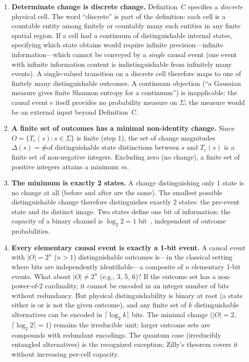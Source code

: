 \documentclass[aps,prd,twocolumn,showpacs,superscriptaddress,preprintnumbers]{revtex4-2}
\begin{document}
\begin{enumerate}
    \item \textbf{Determinate change is discrete change.} Definition~C specifies a \emph{discrete} physical cell. The word ``discrete'' is part of the definition: each cell is a countable entity among finitely or countably many such entities in any finite spatial region. If a cell had a continuum of distinguishable internal states, specifying which state obtains would require infinite precision---infinite information---which cannot be conveyed by a \emph{single} causal event (one event with infinite information content is indistinguishable from infinitely many events). A single-valued transition on a discrete cell therefore maps to one of finitely many distinguishable outcomes. A continuum objection (``a Gaussian measure gives finite Shannon entropy for a continuum'') is inapplicable: the causal event $e$ itself provides no probability measure on $\Sigma$; the measure would be an external input beyond Definition~C.

    \item \textbf{A finite set of outcomes has a minimal non-identity change.} Since $O = \{T_e(s) : s \in \Sigma\}$ is finite (step 1), the set of change magnitudes $\Delta(s) = \text{\# of distinguishable state distinctions between } s \text{ and } T_e(s)$ is a finite set of non-negative integers. Excluding zero (no change), a finite set of positive integers attains a minimum $m$.

    \item \textbf{The minimum is exactly 2 states.} A change distinguishing only 1 state is no change at all (before and after are the same). The smallest possible distinguishable change therefore distinguishes exactly 2 states: the pre-event state and its distinct image. Two states define one bit of information: the capacity of a binary channel is $\log_2 2 = 1$ bit~\cite{Shannon1948}, independent of outcome probabilities.

    \item \textbf{Every elementary causal event is exactly a 1-bit event.} A causal event with $|O| = 2^n$ ($n > 1$) distinguishable outcomes is---in the classical setting where bits are independently identifiable---a composite of $n$ elementary 1-bit events. What about $|O| \neq 2^n$ (e.g., 3, 5, 6)? If the outcome set has a non-power-of-2 cardinality, it cannot be encoded in an integer number of bits without redundancy. But physical distinguishability is binary at root (a state either is or is not the given outcome), and any finite set of $k$ distinguishable alternatives can be encoded in $\lceil\log_2 k\rceil$ bits. The minimal change ($|O|=2$, $\lceil\log_2 2\rceil = 1$) remains the irreducible unit; larger outcome sets are compounds with redundant encodings. The quantum case (irreducibly entangled alternatives) is the recognized exception; Zilly's theorem covers it without increasing per-cell capacity.
\end{enumerate}
\end{document}
